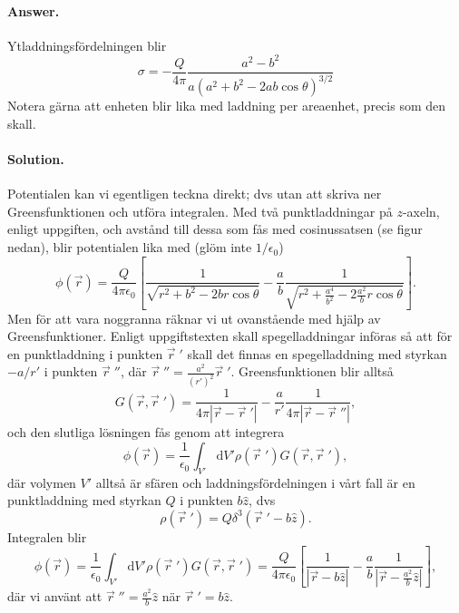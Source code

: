\documentclass[%
oneside,                 %
final,                   %
10pt]{article}
\newenvironment{doconceexercise}{}{}
\begin{document}
\begin{doconceexercise}
\noindent


\paragraph{Answer.}
Ytladdningsfördelningen blir
$$
\sigma = -\frac{Q}{4 \pi} \frac{a^2 - b^2}{a \left( a^2 + b^2 - 2 a b \cos\theta \right)^{3/2}}
$$
Notera gärna att enheten blir lika med laddning per areaenhet, precis som den skall.



\paragraph{Solution.}
Potentialen kan vi egentligen teckna direkt; dvs utan att skriva ner Greensfunktionen och utföra integralen. Med två punktladdningar på $z$-axeln, enligt uppgiften, och avstånd till dessa som fås med cosinussatsen (se figur nedan), blir potentialen lika med (glöm inte $1/\epsilon_0$)
$$
\phi(\vec{r}) = \frac{Q}{4\pi\epsilon_0} \left[ \frac{1}{\sqrt{r^2 + b^2 - 2 b r \cos\theta}} - \frac{a}{b} \frac{1}{\sqrt{r^2 + \frac{a^4}{b^2} - 2 \frac{a^2}{b} r\cos\theta}}\right].
$$
Men för att vara noggranna räknar vi ut ovanstående med hjälp av Greensfunktioner. Enligt uppgiftstexten skall spegelladdningar införas så att för en punktladdning i punkten $\vec{r}{\;}'$ skall det finnas en spegelladdning med styrkan $-a/r'$ i punkten $\vec{r}{\;}''$, där $\vec{r}{\;}'' = \frac{a^2}{(r')^2} \vec{r}{\;}'$. Greensfunktionen blir alltså
$$
G(\vec{r},\vec{r}{\;}') = \frac{1}{4\pi|\vec{r} - \vec{r}{\;}'|} - \frac{a}{r'} \frac{1}{4\pi|\vec{r} - \vec{r}{\;}''|},
$$
och den slutliga lösningen fås genom att integrera
$$
\phi(\vec{r}) = \frac{1}{\epsilon_0} \int_{V'} \mbox{d}V' \rho(\vec{r}{\;}') G(\vec{r},\vec{r}{\;}'),
$$
där volymen $V'$ alltså är sfären och laddningsfördelningen i vårt fall är en punktladdning med styrkan $Q$ i punkten $b\hat{z}$, dvs
$$
\rho(\vec{r}{\;}') = Q \delta^3(\vec{r}{\;}' - b\hat{z}).
$$
Integralen blir
$$
\phi(\vec{r}) = \frac{1}{\epsilon_0} \int_{V'} \mbox{d}V' \rho(\vec{r}{\;}') G(\vec{r},\vec{r}{\;}')
= \frac{Q}{4\pi\epsilon_0} \left[ \frac{1}{|\vec{r} - b\hat{z}|} - \frac{a}{b} \frac{1}{\left| \vec{r} - \frac{a^2}{b}\hat{z} \right|} \right],
$$
där vi använt att $\vec{r}{\;}'' = \frac{a^2}{b}\hat{z}$ när $\vec{r}{\;}'=b\hat{z}$.




\end{doconceexercise}
\end{document}
